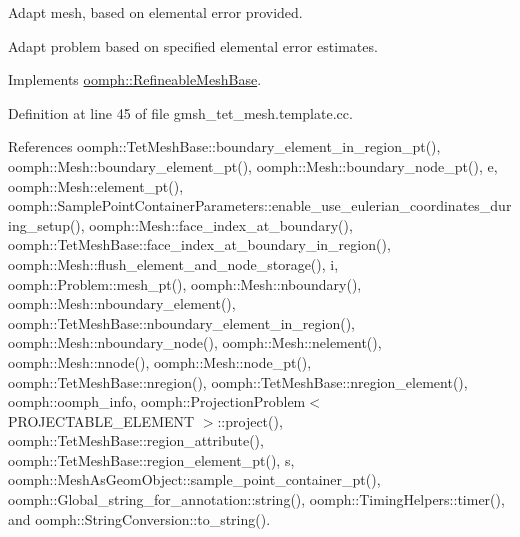 Adapt mesh, based on elemental error provided. 

Adapt problem based on specified elemental error estimates. 

Implements \hyperlink{classoomph_1_1RefineableMeshBase_aabe38fc56f2f12e91f2a2e8a4cf663b0}{oomph\+::\+Refineable\+Mesh\+Base}.



Definition at line 45 of file gmsh\+\_\+tet\+\_\+mesh.\+template.\+cc.



References oomph\+::\+Tet\+Mesh\+Base\+::boundary\+\_\+element\+\_\+in\+\_\+region\+\_\+pt(), oomph\+::\+Mesh\+::boundary\+\_\+element\+\_\+pt(), oomph\+::\+Mesh\+::boundary\+\_\+node\+\_\+pt(), e, oomph\+::\+Mesh\+::element\+\_\+pt(), oomph\+::\+Sample\+Point\+Container\+Parameters\+::enable\+\_\+use\+\_\+eulerian\+\_\+coordinates\+\_\+during\+\_\+setup(), oomph\+::\+Mesh\+::face\+\_\+index\+\_\+at\+\_\+boundary(), oomph\+::\+Tet\+Mesh\+Base\+::face\+\_\+index\+\_\+at\+\_\+boundary\+\_\+in\+\_\+region(), oomph\+::\+Mesh\+::flush\+\_\+element\+\_\+and\+\_\+node\+\_\+storage(), i, oomph\+::\+Problem\+::mesh\+\_\+pt(), oomph\+::\+Mesh\+::nboundary(), oomph\+::\+Mesh\+::nboundary\+\_\+element(), oomph\+::\+Tet\+Mesh\+Base\+::nboundary\+\_\+element\+\_\+in\+\_\+region(), oomph\+::\+Mesh\+::nboundary\+\_\+node(), oomph\+::\+Mesh\+::nelement(), oomph\+::\+Mesh\+::nnode(), oomph\+::\+Mesh\+::node\+\_\+pt(), oomph\+::\+Tet\+Mesh\+Base\+::nregion(), oomph\+::\+Tet\+Mesh\+Base\+::nregion\+\_\+element(), oomph\+::oomph\+\_\+info, oomph\+::\+Projection\+Problem$<$ P\+R\+O\+J\+E\+C\+T\+A\+B\+L\+E\+\_\+\+E\+L\+E\+M\+E\+N\+T $>$\+::project(), oomph\+::\+Tet\+Mesh\+Base\+::region\+\_\+attribute(), oomph\+::\+Tet\+Mesh\+Base\+::region\+\_\+element\+\_\+pt(), s, oomph\+::\+Mesh\+As\+Geom\+Object\+::sample\+\_\+point\+\_\+container\+\_\+pt(), oomph\+::\+Global\+\_\+string\+\_\+for\+\_\+annotation\+::string(), oomph\+::\+Timing\+Helpers\+::timer(), and oomph\+::\+String\+Conversion\+::to\+\_\+string().

\mbox{\label{classoomph_1_1RefineableGmshTetMesh_aea1e1c26bb8772231ce5b2b8d915f764}} 
